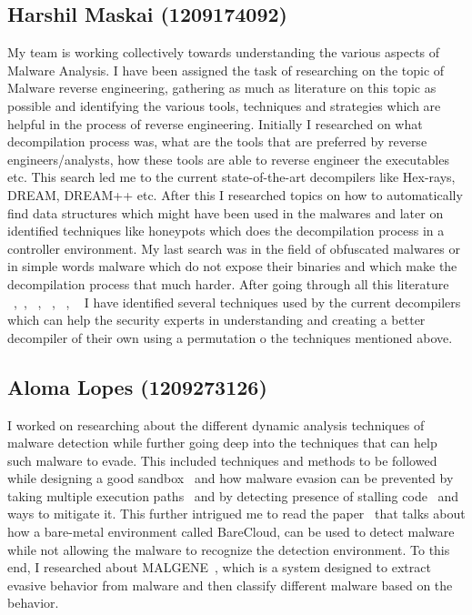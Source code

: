 \documentclass[11pt]{article}
\begin{document}
	
\subsection{Harshil Maskai (1209174092)}
My team is working collectively towards understanding the various aspects of Malware Analysis. I have been assigned the task of researching on the topic of Malware reverse engineering, gathering as much as literature on this topic as possible and identifying the various tools, techniques and strategies which are helpful in the process of reverse engineering. Initially I researched on what decompilation process was, what are the tools that are preferred by reverse engineers/analysts, how these tools are able to reverse engineer the executables etc. This search led me to the current state-of-the-art decompilers like Hex-rays, DREAM, DREAM++ etc. After this I researched topics on how to automatically find data structures which might have been used in the malwares and later on identified techniques like honeypots which does the decompilation process in a controller environment. My last search was in the field of obfuscated malwares or in simple words malware which do not expose their binaries and which make the decompilation process that much harder.
After going through all this literature ~\cite{yakdan2016helping},~\cite{guilfanov2008decompilers}, ~\cite{yakdan2015no}, ~\cite{lin2010automatic}, ~\cite{honeypot2016}, ~\cite{rotalumegatech} I have identified several techniques used by the current decompilers which can help the security experts in understanding and creating a better decompiler of their own using a permutation o the techniques mentioned above.


\subsection{Aloma Lopes (1209273126)}
I worked on researching about the different dynamic analysis techniques of malware detection while further going deep into the techniques that can help such malware to evade. This included techniques and methods to be followed while designing a good sandbox~\cite{kruegel2014full} and how malware evasion can be prevented by taking multiple execution paths~\cite{moser2007exploring} and by detecting presence of stalling code~\cite{kolbitsch2011power} and ways to mitigate it. This further intrigued me to read the paper~\cite{kirat2014barecloud} that talks about how a bare-metal environment called BareCloud, can be used to detect malware while not allowing the malware to recognize the detection environment. To this end, I researched about MALGENE~\cite{kirat2015malgene}, which is a system designed to extract evasive behavior from malware and then classify different malware based on the behavior.
\end{document}
